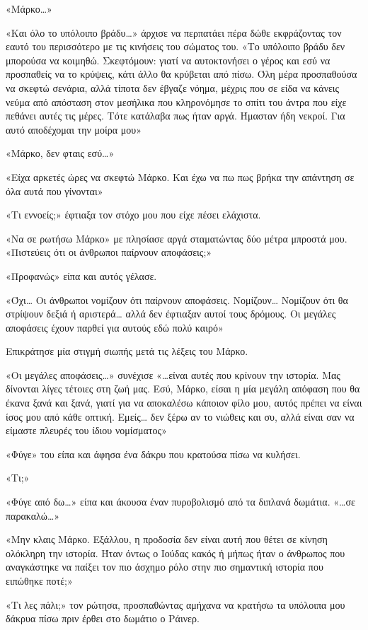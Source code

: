 \documentclass[12pt,twoside, openany]{book}
\begin{document}
«Μάρκο…»

«Και όλο το υπόλοιπο βράδυ…» άρχισε να περπατάει πέρα δώθε εκφράζοντας τον εαυτό του περισσότερο με τις κινήσεις του σώματος του. «Το υπόλοιπο βράδυ δεν μπορούσα να κοιμηθώ. Σκεφτόμουν: γιατί να αυτοκτονήσει ο γέρος και εσύ να προσπαθείς να το κρύψεις, κάτι άλλο θα κρύβεται από πίσω. Όλη μέρα προσπαθούσα να σκεφτώ σενάρια, αλλά τίποτα δεν έβγαζε νόημα, μέχρις που σε είδα να κάνεις νεύμα από απόσταση στον μεσήλικα που κληρονόμησε το σπίτι του άντρα που είχε πεθάνει αυτές τις μέρες. Τότε κατάλαβα πως ήταν αργά. Ήμασταν ήδη νεκροί. Για αυτό αποδέχομαι την μοίρα μου»

«Μάρκο, δεν φταις εσύ…»

«Είχα αρκετές ώρες να σκεφτώ Μάρκο. Και έχω να πω πως βρήκα την απάντηση σε όλα αυτά που γίνονται»

«Τι εννοείς;» έφτιαξα τον στόχο μου που είχε πέσει ελάχιστα.

«Να σε ρωτήσω Μάρκο» με πλησίασε αργά σταματώντας δύο μέτρα μπροστά μου. «Πιστεύεις ότι οι άνθρωποι παίρνουν αποφάσεις;»

«Προφανώς» είπα και αυτός γέλασε.

«Όχι… Οι άνθρωποι νομίζουν ότι παίρνουν αποφάσεις. Νομίζουν… Νομίζουν ότι θα στρίψουν δεξιά ή αριστερά… αλλά δεν έφτιαξαν αυτοί τους δρόμους. Οι μεγάλες αποφάσεις έχουν παρθεί για αυτούς εδώ πολύ καιρό» 

Επικράτησε μία στιγμή σιωπής μετά τις λέξεις του Μάρκο.

«Οι μεγάλες αποφάσεις…» συνέχισε «…είναι αυτές που κρίνουν την ιστορία. Μας δίνονται λίγες τέτοιες στη ζωή μας. Εσύ, Μάρκο, είσαι η μία μεγάλη απόφαση που θα έκανα ξανά και ξανά, γιατί για να αποκαλέσω κάποιον φίλο μου, αυτός πρέπει να είναι ίσος μου από κάθε οπτική. Εμείς… δεν ξέρω αν το νιώθεις και συ, αλλά είναι σαν να είμαστε πλευρές του ίδιου νομίσματος»

«Φύγε» του είπα και άφησα ένα δάκρυ που κρατούσα πίσω να κυλήσει.

«Τι;»

«Φύγε από δω…» είπα και άκουσα έναν πυροβολισμό από τα διπλανά δωμάτια. «…σε παρακαλώ…»

«Μην κλαις Μάρκο. Εξάλλου, η προδοσία δεν είναι αυτή που θέτει σε κίνηση ολόκληρη την ιστορία. Ήταν όντως ο Ιούδας κακός ή μήπως ήταν ο άνθρωπος που αναγκάστηκε να παίξει τον πιο άσχημο ρόλο στην πιο σημαντική ιστορία που ειπώθηκε ποτέ;»

«Τι λες πάλι;» τον ρώτησα, προσπαθώντας αμήχανα να κρατήσω τα υπόλοιπα μου δάκρυα πίσω πριν έρθει στο δωμάτιο ο Ράινερ.
\end{document}
